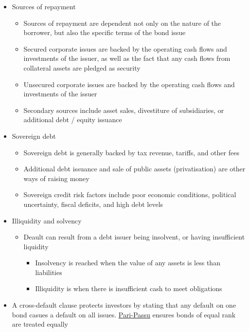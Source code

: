 \documentclass[../notes_compiled.tex]{subfiles}
\begin{document}
\begin{itemize}
\item Sources of repayment
\begin{itemize}
\item Sources of repayment are dependent not only on the nature of the borrower, but also the specific terms of the bond issue
\item Secured corporate issues are backed by the operating cash flows and investments of the issuer, as well as the fact that any cash flows from collateral assets are pledged as security
\item Unsecured corporate issues are backed by the operating cash flows and investments of the issuer
\item Secondary sources include asset sales, divestiture of subsidiaries, or additional debt / equity issuance
\end{itemize}

\item Sovereign debt
\begin{itemize}
\item Sovereign debt is generally backed by tax revenue, tariffs, and other fees
\item Additional debt issuance and sale of public assets (privatisation) are other ways of raising money
\item Sovereign credit risk factors include poor economic conditions, political uncertainty, fiscal deficits, and high debt levels
\end{itemize}

\item Illiquidity and solvency
\begin{itemize}
\item Deault can result from a debt issuer being insolvent, or having insufficient liquidity
\begin{itemize}
\item Insolvency is reached when the value of any assets is less than liabilities
\item Illiquidity is when there is insufficient cash to meet obligations
\end{itemize}
\end{itemize}

\item A cross-default clause protects investors by stating that any default on one bond casues a default on all issues. \underline{Pari-Passu} ensures bonds of equal rank are treated equally

\end{itemize}
\end{document}
